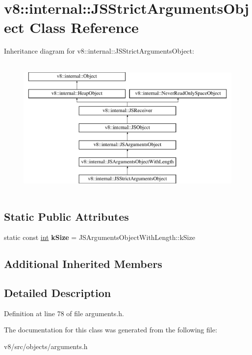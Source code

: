 \hypertarget{classv8_1_1internal_1_1JSStrictArgumentsObject}{}\section{v8\+:\+:internal\+:\+:J\+S\+Strict\+Arguments\+Object Class Reference}
\label{classv8_1_1internal_1_1JSStrictArgumentsObject}
Inheritance diagram for v8\+:\+:internal\+:\+:J\+S\+Strict\+Arguments\+Object\+:\begin{figure}[H]
\begin{center}
\leavevmode
\includegraphics[height=7.000000cm]{classv8_1_1internal_1_1JSStrictArgumentsObject}
\end{center}
\end{figure}
\subsection*{Static Public Attributes}
\begin{DoxyCompactItemize}
\item 
\mbox{\label{classv8_1_1internal_1_1JSStrictArgumentsObject_a484727970269d041b3d92b97f76d9061}} 
static const \mbox{\hyperlink{classint}{int}} {\bfseries k\+Size} = J\+S\+Arguments\+Object\+With\+Length\+::k\+Size
\end{DoxyCompactItemize}
\subsection*{Additional Inherited Members}


\subsection{Detailed Description}


Definition at line 78 of file arguments.\+h.



The documentation for this class was generated from the following file\+:\begin{DoxyCompactItemize}
\item 
v8/src/objects/arguments.\+h\end{DoxyCompactItemize}

